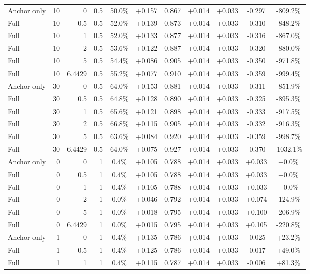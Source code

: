 \begin{table}[htbp]
\begin{tabular}{lrrrccccccc}
Anchor only & 10 & 0 & 0.5 & 50.0\% & +0.157 & 0.867 & +0.014 & +0.033 & -0.297 & -809.2\% \\
Full & 10 & 0.5 & 0.5 & 52.0\% & +0.139 & 0.873 & +0.014 & +0.033 & -0.310 & -848.2\% \\
Full & 10 & 1 & 0.5 & 52.0\% & +0.133 & 0.877 & +0.014 & +0.033 & -0.316 & -867.0\% \\
Full & 10 & 2 & 0.5 & 53.6\% & +0.122 & 0.887 & +0.014 & +0.033 & -0.320 & -880.0\% \\
Full & 10 & 5 & 0.5 & 54.4\% & +0.086 & 0.905 & +0.014 & +0.033 & -0.350 & -971.8\% \\
Full & 10 & 6.4429 & 0.5 & 55.2\% & +0.077 & 0.910 & +0.014 & +0.033 & -0.359 & -999.4\% \\
Anchor only & 30 & 0 & 0.5 & 64.0\% & +0.153 & 0.881 & +0.014 & +0.033 & -0.311 & -851.9\% \\
Full & 30 & 0.5 & 0.5 & 64.8\% & +0.128 & 0.890 & +0.014 & +0.033 & -0.325 & -895.3\% \\
Full & 30 & 1 & 0.5 & 65.6\% & +0.121 & 0.898 & +0.014 & +0.033 & -0.333 & -917.5\% \\
Full & 30 & 2 & 0.5 & 66.8\% & +0.115 & 0.905 & +0.014 & +0.033 & -0.332 & -916.3\% \\
Full & 30 & 5 & 0.5 & 63.6\% & +0.084 & 0.920 & +0.014 & +0.033 & -0.359 & -998.7\% \\
Full & 30 & 6.4429 & 0.5 & 64.0\% & +0.075 & 0.927 & +0.014 & +0.033 & -0.370 & -1032.1\% \\
Anchor only & 0 & 0 & 1 & 0.4\% & +0.105 & 0.788 & +0.014 & +0.033 & +0.033 & +0.0\% \\
Full & 0 & 0.5 & 1 & 0.4\% & +0.105 & 0.788 & +0.014 & +0.033 & +0.033 & +0.0\% \\
Full & 0 & 1 & 1 & 0.4\% & +0.105 & 0.788 & +0.014 & +0.033 & +0.033 & +0.0\% \\
Full & 0 & 2 & 1 & 0.0\% & +0.046 & 0.792 & +0.014 & +0.033 & +0.074 & -124.9\% \\
Full & 0 & 5 & 1 & 0.0\% & +0.018 & 0.795 & +0.014 & +0.033 & +0.100 & -206.9\% \\
Full & 0 & 6.4429 & 1 & 0.0\% & +0.015 & 0.795 & +0.014 & +0.033 & +0.105 & -220.8\% \\
Anchor only & 1 & 0 & 1 & 0.4\% & +0.135 & 0.786 & +0.014 & +0.033 & -0.025 & +23.2\% \\
Full & 1 & 0.5 & 1 & 0.4\% & +0.125 & 0.786 & +0.014 & +0.033 & -0.017 & +49.0\% \\
Full & 1 & 1 & 1 & 0.4\% & +0.115 & 0.787 & +0.014 & +0.033 & -0.006 & +81.3\% \\

\end{tabular}
\end{table}
